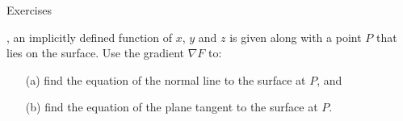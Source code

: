 {\noindent Exercises}
{, an implicitly defined function of $x$, $y$ and $z$ is given along with a point $P$ that lies on the surface. Use the gradient $\nabla F$ to:
\begin{enumerate}
	\item [(a)] find the equation of the normal line to the surface at $P$, and
	\item	[(b)] find the equation of the plane tangent  to the surface at $P$.
\end{enumerate}
}
